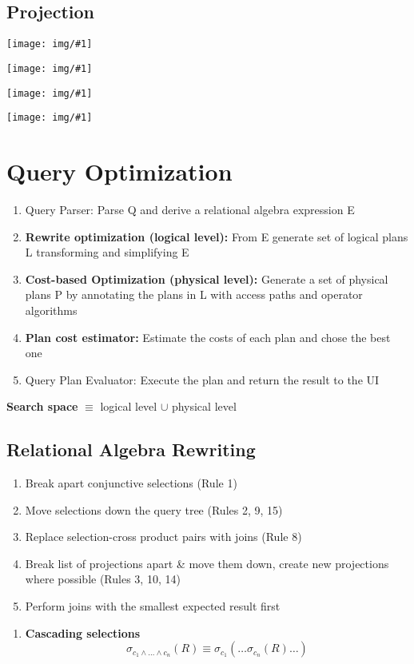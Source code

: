\documentclass[a4paper]{article}
\newcommand{\img}[1]{\begin{center}
    \texttt{[image: img/\#1]}
\end{center} }
\begin{document}
\begin{twocolumn}
\subsection{Projection}
\img{projection_sort}
\img{projection_sort_elim}
\img{projection_hash_p0}
\img{projection_hash_p1}


\section{Query Optimization}
\begin{enumerate}
	\item Query Parser: Parse Q and derive a relational algebra expression E
	\item \textbf{Rewrite optimization (logical level):} From E generate set of logical plans L transforming and simplifying E
	\item \textbf{Cost-based Optimization (physical level):} Generate a set of physical plans P by annotating the plans in L with access paths and operator algorithms
	\item \textbf{Plan cost estimator:} Estimate the costs of each plan and chose the best one
	\item Query Plan Evaluator: Execute the plan and return the result to the UI
\end{enumerate}
\textbf{Search space} $\equiv$ logical level $\cup$ physical level

\subsection{Relational Algebra Rewriting}
\begin{enumerate}
	\item Break apart conjunctive selections (Rule 1)
	\item Move selections down the query tree (Rules 2, 9, 15)
	\item Replace selection-cross product pairs with joins (Rule 8)
	\item Break list of projections apart \& move them down, create new projections where possible (Rules 3, 10, 14)
	\item Perform joins with the smallest expected result first
\end{enumerate}
\begin{enumerate}
	\item \textbf{Cascading selections}
	\[ \sigma_{c_1 \wedge \dots \wedge c_n}(R) \equiv \sigma_{c_1}(\dots \sigma_{c_n}(R) \dots) \]
	

\end{enumerate}
\end{twocolumn}
\end{document}
